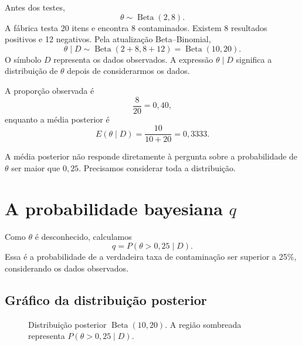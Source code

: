 \documentclass[11pt,letter]{article}
\begin{document}
Antes dos testes,
\[
\theta\sim\operatorname{Beta}(2,8).
\]
A fábrica testa 20 itens e encontra 8 contaminados. Existem 8 resultados
positivos e 12 negativos. Pela atualização Beta--Binomial,
\[
\theta\mid D
\sim\operatorname{Beta}(2+8,8+12)
=\operatorname{Beta}(10,20).
\]
O símbolo $D$ representa os dados observados. A expressão $\theta\mid D$
significa a distribuição de $\theta$ depois de considerarmos os dados.

A proporção observada é
\[
\frac{8}{20}=0{,}40,
\]
enquanto a média posterior é
\[
E(\theta\mid D)=\frac{10}{10+20}=0{,}3333.
\]

\begin{atencao}
A média posterior não responde diretamente à pergunta sobre a probabilidade de
$\theta$ ser maior que $0{,}25$. Precisamos considerar toda a distribuição.
\end{atencao}

\section{A probabilidade bayesiana $q$}

Como $\theta$ é desconhecido, calculamos
\[
q=P(\theta>0{,}25\mid D).
\]
Essa é a probabilidade de a verdadeira taxa de contaminação ser superior a
25\%, considerando os dados observados.
\subsection{Gráfico da distribuição posterior}

\begin{figure}[ht]
\centering
{}
\caption{Distribuição posterior $\operatorname{Beta}(10,20)$. A região
sombreada representa $P(\theta>0{,}25\mid D)$.}
\end{figure}
\end{document}
